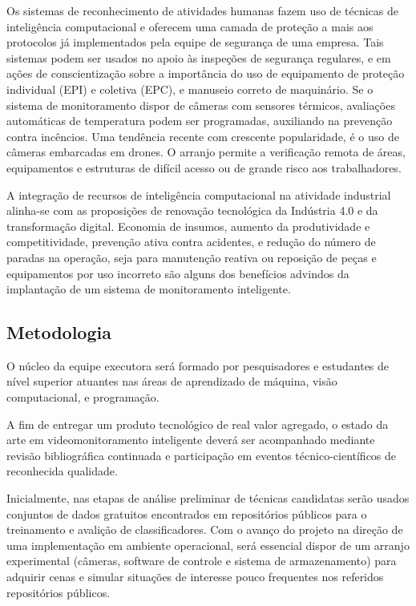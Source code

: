 Os sistemas de reconhecimento de atividades humanas fazem uso de técnicas de inteligência computacional e oferecem uma camada de proteção a mais aos protocolos já implementados pela equipe de segurança de uma empresa. Tais sistemas podem ser usados no apoio às inspeções de segurança regulares, e em ações de conscientização sobre a importância do uso de equipamento de proteção individual (EPI) e coletiva (EPC), e manuseio correto de maquinário. Se o sistema de monitoramento dispor de câmeras com sensores térmicos, avaliações automáticas de temperatura podem ser programadas, auxiliando na prevenção contra incêncios. Uma tendência recente com crescente popularidade, é o uso de câmeras embarcadas em drones. O arranjo permite a verificação remota de áreas, equipamentos e estruturas de difícil acesso ou de grande risco aos trabalhadores.

A integração de recursos de inteligência computacional na atividade industrial alinha-se com as proposições de renovação tecnológica da Indústria 4.0 e da transformação digital. Economia de insumos, aumento da produtividade e competitividade, prevenção ativa contra acidentes, e redução do número de paradas na operação, seja para manutenção reativa ou reposição de peças e equipamentos por uso incorreto são alguns dos benefícios advindos da implantação de um sistema de monitoramento inteligente. 

\subsection{Metodologia}
\label{ssec:metod}

O núcleo da equipe executora será formado por pesquisadores e estudantes de nível superior atuantes nas áreas de aprendizado de máquina, visão computacional, e programação.

A fim de entregar um produto tecnológico de real valor agregado, o estado da arte em videomonitoramento inteligente deverá ser acompanhado mediante revisão bibliográfica continuada e participação em eventos técnico-científicos de reconhecida qualidade.

Inicialmente, nas etapas de análise preliminar de técnicas candidatas serão usados conjuntos de dados gratuitos encontrados em repositórios públicos para o treinamento e avalição de classificadores. Com o avanço do projeto na direção de uma implementação em ambiente operacional, será essencial dispor de um arranjo experimental (câmeras, software de controle e sistema de armazenamento) para adquirir cenas e simular situações de interesse pouco frequentes nos referidos repositórios públicos.

